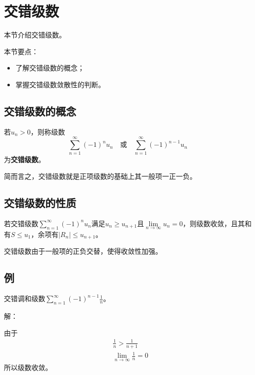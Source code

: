 \section{交错级数}

本节介绍交错级数。

本节要点：
\begin{itemize}
    \item 了解交错级数的概念；
    \item 掌握交错级数敛散性的判断。
\end{itemize}

\subsection{交错级数的概念}

\begin{definition}[交错级数]
若$u_n>0$，则称级数
\[
\sum_{n=1}^{\infty}{\left( -1 \right) ^nu_n} \quad \text{或} \quad \sum_{n=1}^{\infty}{\left( -1 \right) ^{n-1}u_n}
\]
为{\bf 交错级数}。
\end{definition}

简而言之，交错级数就是正项级数的基础上其一般项一正一负。

\subsection{交错级数的性质}

\begin{theorem}[莱布尼兹判别法]
若交错级数$\sum_{n=1}^{\infty}{\left( -1 \right) ^nu_n}$满足$u_n\geqslant u_{n+1}$且$\underset{n\rightarrow \infty}{\lim}u_n=0$，则级数收敛，且其和有$S\leqslant u_1$，余项有$\left| R_n \right|\leqslant u_{n+1}$。
\end{theorem}

交错级数由于一般项的正负交替，使得收敛性加强。

\subsection{例}

\begin{example}
交错调和级数$\sum_{n=1}^{\infty}{\left( -1 \right) ^{n-1}\frac{1}{n}}$。
\end{example}

解：

由于
\begin{align*}
&\frac{1}{n}>\frac{1}{n+1} \\
&\underset{n\rightarrow \infty}{\lim}\frac{1}{n}=0
\end{align*}
所以级数收敛。




